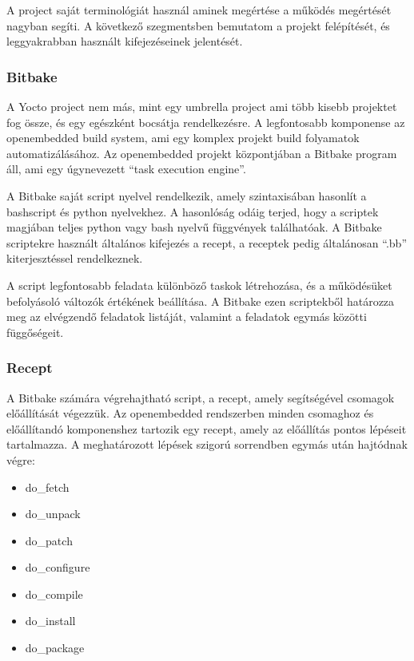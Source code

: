 A project saját terminológiát használ aminek megértése a működés megértését
nagyban segíti. A következő szegmentsben bemutatom a projekt felépítését, és
leggyakrabban használt kifejezéseinek jelentését.

\subsubsection{Bitbake}

A Yocto project nem más, mint egy umbrella project ami több kisebb projektet fog
össze, és egy egészként bocsátja rendelkezésre. A legfontosabb komponense az
openembedded build system, ami egy komplex projekt build folyamatok
automatizálásához. Az openembedded projekt központjában a Bitbake program áll,
ami egy úgynevezett ``task execution engine''.

\medskip

A Bitbake saját script nyelvel rendelkezik, amely szintaxisában hasonlít a
bashscript és python nyelvekhez. A hasonlóság odáig terjed, hogy a scriptek
magjában teljes python vagy bash nyelvű függvények találhatóak. A Bitbake
scriptekre használt általános kifejezés a recept, a receptek pedig általánosan
``.bb'' kiterjesztéssel rendelkeznek.

A script legfontosabb feladata különböző taskok létrehozása, és a működésüket
befolyásoló változók értékének beállítása. A Bitbake ezen scriptekből határozza
meg az elvégzendő feladatok listáját, valamint a feladatok egymás közötti
függőségeit. 

\subsubsection{Recept}

A Bitbake számára végrehajtható script, a recept, amely segítségével csomagok
előállítását végezzük. Az openembedded rendszerben minden csomaghoz és
előállítandó komponenshez tartozik egy recept, amely az előállítás pontos
lépéseit tartalmazza. A meghatározott lépések szigorú sorrendben egymás után
hajtódnak végre:

\begin{itemize}
\item{do\_fetch}
\item{do\_unpack}
\item{do\_patch}
\item{do\_configure}
\item{do\_compile}
\item{do\_install}
\item{do\_package}
\end{itemize}

